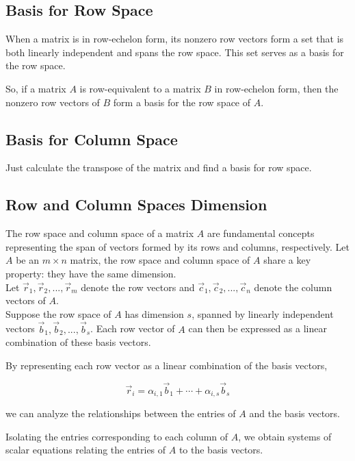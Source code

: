 \subsection{Basis for Row Space}

When a matrix is in row-echelon form, its nonzero row vectors form a set that is both linearly independent and spans the row space. This set serves as a basis for the row space.

So, if a matrix $A$ is row-equivalent to a matrix $B$ in row-echelon form, then the nonzero row vectors of $B$ form a basis for the row space of $A$.

\subsection{Basis for Column Space}

Just calculate the transpose of the matrix and find a basis for row space.

\subsection{Row and Column Spaces Dimension}

The row space and column space of a matrix \( A \) are fundamental concepts representing the span of vectors formed by its rows and columns, respectively. Let \( A \) be an \( m \times n \) matrix, the row space and column space of \( A \) share a key property: they have the same dimension. 
\\

Let \( \vec r_1, \vec r_2, ..., \vec r_m \) denote the row vectors and \( \vec c_1, \vec c_2, ..., \vec c_n \) denote the column vectors of \( A \).
\\

Suppose the row space of \( A \) has dimension \( s \), spanned by linearly independent vectors \( \vec b_1, \vec b_2, ..., \vec b_s \). Each row vector of \( A \) can then be expressed as a linear combination of these basis vectors.

By representing each row vector as a linear combination of the basis vectors, 

$$
\vec r_i = \alpha_{i,1} \vec b_1 + \cdots + \alpha_{i,s} \vec b_s
$$

we can analyze the relationships between the entries of \( A \) and the basis vectors.

Isolating the entries corresponding to each column of \( A \), we obtain systems of scalar equations relating the entries of \( A \) to the basis vectors.

